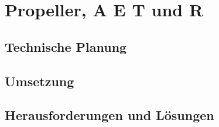 \section{Propeller, A E T und R}

  \subsection{Technische Planung}

  \subsection{Umsetzung}

  \subsection{Herausforderungen und Lösungen}
